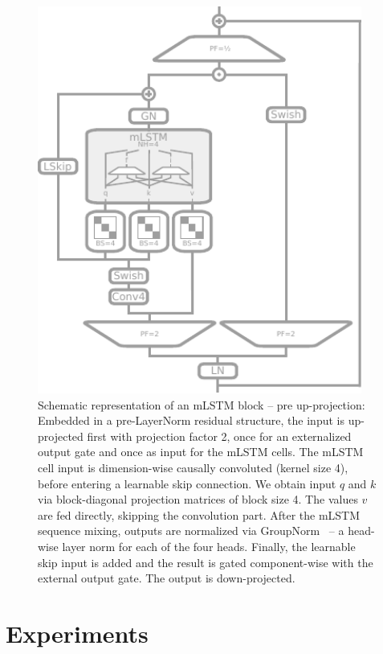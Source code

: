 \documentclass[dvipsnames]{article}
\begin{document}
\begin{appendix}
\begin{figure}[H]
\centering
\includegraphics[width=0.95\textwidth]{figures/desc_mlstm_block_detail.pdf}
\caption{Schematic representation of an mLSTM block -- pre up-projection: Embedded in a pre-LayerNorm residual structure, the input is up-projected first with projection factor 2, once for an externalized output gate and once as input for the mLSTM cells. 
The mLSTM cell input is dimension-wise causally convoluted (kernel size 4), before entering a learnable skip connection. 
We obtain input $q$ and $k$ via block-diagonal projection matrices of block size 4. 
The values $v$ are fed directly, skipping the convolution part. 
After the mLSTM sequence mixing, outputs are normalized via GroupNorm~\citep{Wu:2018} -- a head-wise layer norm for each of the four heads. 
Finally, the learnable skip input is added and the result is gated component-wise with the external output gate. 
The output is down-projected.}
\label{fig:appmLSTM_detailed}
\end{figure}

\newpage
\section{Experiments}
\label{sec:appExp}


\end{appendix}
\end{document}
